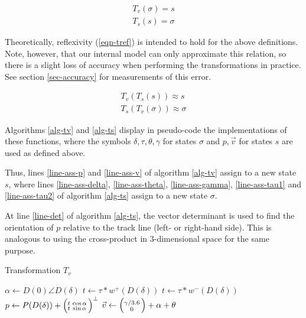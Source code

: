 \documentclass[conference]{IEEEtran}
\newcommand{\vect}[2]{\ensuremath{\Bigl(\negthinspace\begin{smallmatrix}#1\\#2\end{smallmatrix}}\Bigr)}
\begin{document}
\begin{equation}
\begin{alignedat}{1}
\label{eqn-transforms}
T_v (\sigma) = s \\
T_s (s) = \sigma
\end{alignedat}
\end{equation}

Theoretically, reflexivity (\ref{eqn-tref}) is intended to hold for the above definitions. Note, however, that our internal model can only approximate this relation, so there is a slight loss of accuracy when performing the transformations in practice. See section \ref{sec-accuracy} for measurements of this error.

\begin{equation}
\begin{alignedat}{1}
\label{eqn-tref}
T_v (T_s (s)) \approx s \\
T_s (T_v (\sigma)) \approx \sigma
\end{alignedat}
\end{equation}

Algorithms \ref{alg-tv} and \ref{alg-ts} display in pseudo-code the implementations of these functions, where the symbols $\delta, \tau, \theta, \gamma$ for states $\sigma$ and $p, \vec{v}$ for states $s$ are used as defined above.

Thus, lines \ref{line-ass-p} and \ref{line-ass-v} of algorithm \ref{alg-tv} assign to a new state $s$, where lines \ref{line-ass-delta}, \ref{line-ass-theta}, \ref{line-ass-gamma}, \ref{line-ass-tau1} and \ref{line-ass-tau2} of algorithm \ref{alg-ts} assign to a new state $\sigma$.

At line \ref{line-det} of algorithm \ref{alg-ts}, the vector determinant is used to find the orientation of $p$ relative to the track line (left- or right-hand side). This is analogous to using the cross-product in 3-dimensional space \cite{crossp} for the same purpose.

\begin{algorithm}
\caption{Transformation $T_v$}
\label{alg-tv}
\begin{algorithmic}[1]
\State $\alpha \gets D(0) \angle D(\delta)$
	\State $t \gets \tau * w^+(D(\delta))$
\Else
	\State $t \gets \tau * w^-(D(\delta))$
\EndIf
\State $p \gets P(D(\delta))+\vect{t & \cos{\alpha}}{t & \sin{\alpha}}^\bot$ \label{line-ass-p} 
\State $\vec{v} \gets \vect{\gamma / 3.6}{0}+\alpha+\theta$ \label{line-ass-v} 
\end{algorithmic}
\end{algorithm}
\end{document}
